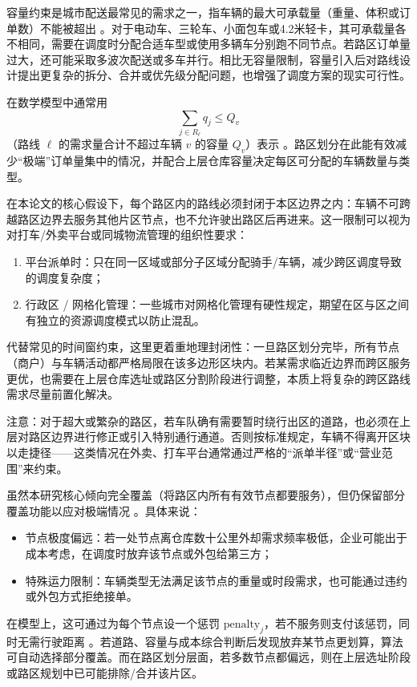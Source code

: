 \documentclass[12pt,a4paper,twoside]{ctexbook}
\begin{document}
容量约束是城市配送最常见的需求之一，指车辆的最大可承载量（重量、体积或订单数）不能被超出 \cite{baldacci2009unified}。对于电动车、三轮车、小面包车或4.2米轻卡，其可承载量各不相同，需要在调度时分配合适车型或使用多辆车分别跑不同节点。若路区订单量过大，还可能采取多波次配送或多车并行。相比无容量限制，容量引入后对路线设计提出更复杂的拆分、合并或优先级分配问题，也增强了调度方案的现实可行性。

在数学模型中通常用
\[
\sum_{j\in R_\ell} q_j \le Q_v
\]
（路线 $\ell$ 的需求量合计不超过车辆 $v$ 的容量 $Q_v$）表示 \cite{archetti2012vehicle}。路区划分在此能有效减少“极端”订单量集中的情况，并配合上层仓库容量决定每区可分配的车辆数量与类型。

在本论文的核心假设下，每个路区内的路线必须封闭于本区边界之内：车辆不可跨越路区边界去服务其他片区节点，也不允许驶出路区后再进来。这一限制可以视为对打车/外卖平台或同城物流管理的组织性要求：
\begin{enumerate}
    \item 平台派单时：只在同一区域或部分子区域分配骑手/车辆，减少跨区调度导致的调度复杂度；
    \item 行政区 / 网格化管理：一些城市对网格化管理有硬性规定，期望在区与区之间有独立的资源调度模式以防止混乱。
\end{enumerate}

代替常见的时间窗约束，这里更着重地理封闭性：一旦路区划分完毕，所有节点（商户）与车辆活动都严格局限在该多边形区块内。若某需求临近边界而跨区服务更优，也需要在上层仓库选址或路区分割阶段进行调整，本质上将复杂的跨区路线需求尽量前置化解决。

注意：对于超大或繁杂的路区，若车队确有需要暂时绕行出区的道路，也必须在上层对路区边界进行修正或引入特别通行通道。否则按标准规定，车辆不得离开区块以走捷径——这类情况在外卖、打车平台通常通过严格的“派单半径”或“营业范围”来约束。

虽然本研究核心倾向完全覆盖（将路区内所有有效节点都要服务），但仍保留部分覆盖功能以应对极端情况 \cite{salazar2013multi}。具体来说：
\begin{itemize}
    \item 节点极度偏远：若一处节点离仓库数十公里外却需求频率极低，企业可能出于成本考虑，在调度时放弃该节点或外包给第三方；
    \item 特殊运力限制：车辆类型无法满足该节点的重量或时段需求，也可能通过违约或外包方式拒绝接单。
\end{itemize}

在模型上，这可通过为每个节点设一个惩罚 $\mathrm{penalty}_j$，若不服务则支付该惩罚，同时无需行驶距离 \cite{salazaraguilar2013multi}。若道路、容量与成本综合判断后发现放弃某节点更划算，算法可自动选择部分覆盖。而在路区划分层面，若多数节点都偏远，则在上层选址阶段或路区规划中已可能排除/合并该片区。
\end{document}
